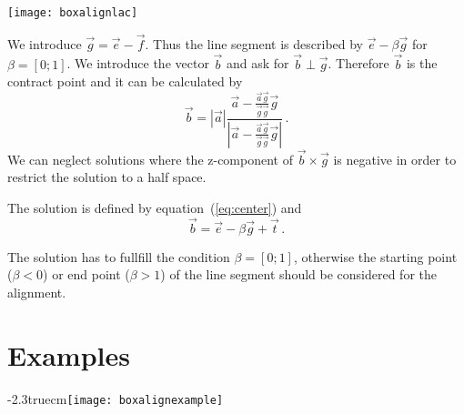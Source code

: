 \documentclass{article}
\begin{document}
\centerline{\texttt{[image: boxalignlac]}}

We introduce $\vec g=\vec e-\vec f$. Thus the line segment is
described by $\vec e-\beta \vec g$ for $\beta=[0;1]$. We introduce the
vector $\vec b$ and ask for $\vec b\perp\vec g$. Therefore $\vec b$ is
the contract point and it can be calculated by
\begin{equation}
\vec b=|\vec a|\frac{\vec a-\frac{\vec a\vec g}{\vec g\vec g}\vec g}
                    {\left|\vec a-\frac{\vec a\vec g}{\vec g\vec g}\vec g\right|}\,.
\end{equation}
We can neglect solutions where the z-component of $\vec b\times\vec g$
is negative in order to restrict the solution to a half space.

The solution is defined by equation~(\ref{eq:center}) and
\begin{equation}
\vec b=\vec e-\beta\vec g+\vec t\,.
\end{equation}

The solution has to fullfill the condition $\beta=[0;1]$, otherwise
the starting point ($\beta<0$) or end point ($\beta>1$) of the line
segment should be considered for the alignment.

\section{Examples}
\hbox{\kern-2.3truecm\texttt{[image: boxalignexample]}}
\end{document}
